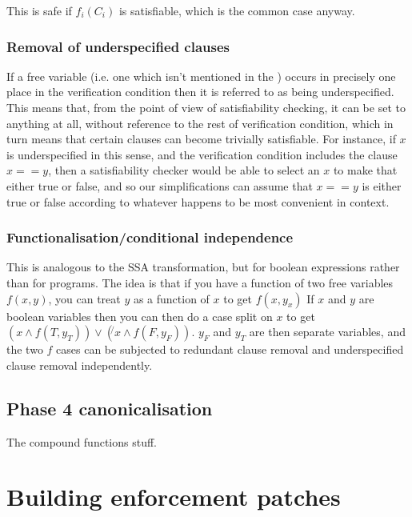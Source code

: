 \documentclass[12pt,a4paper]{book}
\begin{document}
This is safe if $f_i(C_i)$ is satisfiable, which is the common case anyway.

\subsubsection{Removal of underspecified clauses}

If a free variable (i.e. one which isn't mentioned in the \StateMachines) occurs in precisely one place in the verification condition then it is referred to as being underspecified.
This means that, from the point of view of satisfiability checking, it can be set to anything at all, without reference to the rest of verification condition, which in turn means that certain clauses can become trivially satisfiable.
For instance, if $x$ is underspecified in this sense, and the verification condition includes the clause $x == y$, then a satisfiability checker would be able to select an $x$ to make that either true or false, and so our simplifications can assume that $x == y$ is either true or false according to whatever happens to be most convenient in context.

\subsubsection{Functionalisation/conditional independence}

This is analogous to the SSA transformation, but for boolean expressions rather than for programs.
The idea is that if you have a function of two free variables $f(x, y)$, you can treat $y$ as a function of $x$ to get $f(x, y_x)$
If $x$ and $y$ are boolean variables then you can then do a case split on $x$ to get $(x \wedge f(T, y_T)) \vee (\not{}x \wedge f(F, y_F))$.
$y_F$ and $y_T$ are then separate variables, and the two $f$ cases can be subjected to redundant clause removal and underspecified clause removal independently.



\subsection{Phase 4 canonicalisation}
The compound functions stuff.

\section{Building enforcement patches}
\end{document}
